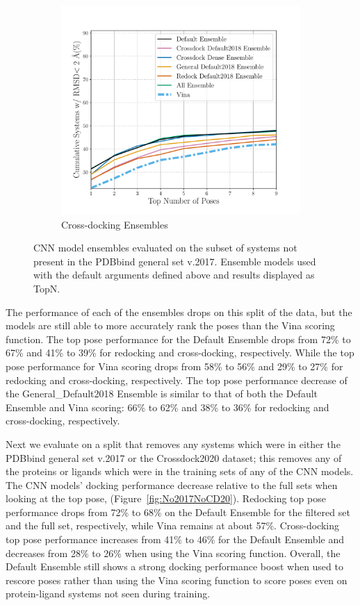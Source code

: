 \documentclass[journal=jcisd8,manuscript=article]{achemso}
\begin{document}
\begin{figure}
\begin{subfigure}[b]{0.48\textwidth}
		\includegraphics[width=\textwidth]{figures/crossdocking/ensemble_models_no2017_line.pdf}
		\caption{Cross-docking Ensembles}
        \label{fig:No2017EnsCD}
    \end{subfigure}
	\caption{CNN model ensembles evaluated on the subset of systems not present in the PDBbind general set v.2017. Ensemble models used with the default arguments defined above and results displayed as TopN.}
	\label{fig:No2017}
\end{figure}

The performance of each of the ensembles drops on this split of the data, but the models are still able to more accurately rank the poses than the Vina scoring function. The top pose performance for the Default Ensemble drops from 72\% to 67\% and 41\% to 39\% for redocking and cross-docking, respectively. While the top pose performance for Vina scoring drops from 58\% to 56\% and 29\% to 27\% for redocking and cross-docking, respectively. The top pose performance decrease of the General\_Default2018 Ensemble is similar to that of both the Default Ensemble and Vina scoring: 66\% to 62\% and 38\% to 36\% for redocking and cross-docking, respectively.

Next we evaluate on a split that removes any systems which were in either the PDBbind general set v.2017 or the Crossdock2020 dataset; this removes any of the proteins or ligands which were in the training sets of any of the CNN models. The CNN models' docking performance decrease relative to the full sets when looking at the top pose, (Figure~\ref{fig:No2017NoCD20}). Redocking top pose performance drops from 72\% to 68\% on the Default Ensemble for the filtered set and the full set, respectively, while Vina remains at about 57\%. Cross-docking top pose performance increases from 41\% to 46\% for the Default Ensemble and decreases from 28\% to 26\% when using the Vina scoring function. Overall, the Default Ensemble still shows a strong docking performance boost when used to rescore poses rather than using the Vina scoring function to score poses even on protein-ligand systems not seen during training.
\end{document}
